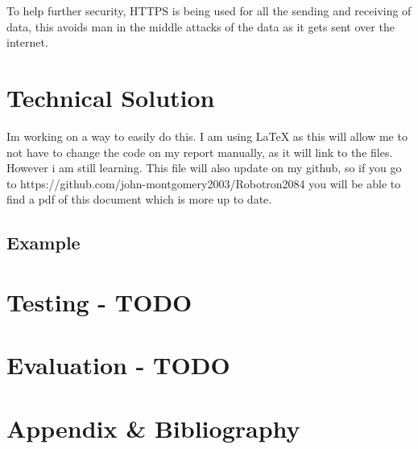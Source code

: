 \documentclass[a4paper, 11pt]{report}
\begin{document}
To help further security, HTTPS is being used for all the sending and receiving of data, this avoids man in the middle attacks of the data as it gets sent over the internet. 


\chapter{Technical Solution}
Im working on a way to easily do this. I am using LaTeX as this will allow me to not have to change the code on my report manually, as it will link to the files. However i am still learning. This file will also update on my github, so if you go to https://github.com/john-montgomery2003/Robotron2084 you will be able to find a pdf of this document which is more up to date.

\section{Example}

\chapter{Testing - TODO}
\chapter{Evaluation - TODO}
\chapter{Appendix \& Bibliography}
\end{document}
